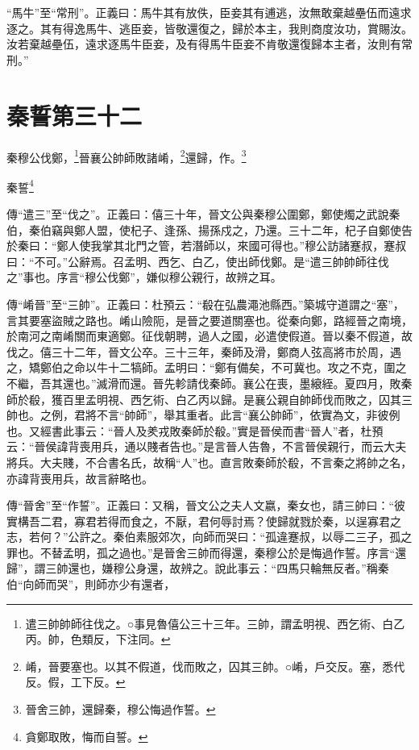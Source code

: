 {\noindent\shu{}\fzkt “馬牛”至“常刑”。正義曰：馬牛其有放佚，臣妾其有逋逃，汝無敢棄越壘伍而遠求逐之。其有得逸馬牛、逃臣妾，皆敬還復之，歸於本主，我則商度汝功，賞賜汝。汝若棄越壘伍，遠求逐馬牛臣妾，及有得馬牛臣妾不肯敬還復歸本主者，汝則有常刑。” \par}

\section{秦誓第三十二}


秦穆公伐鄭，\footnote{遣三帥帥師往伐之。○事見魯僖公三十三年。三帥，謂孟明視、西乞術、白乙丙。帥，色類反，下注同。}晉襄公帥師敗諸崤，\footnote{崤，晉要塞也。以其不假道，伐而敗之，囚其三帥。○崤，戶交反。塞，悉代反。假，工下反。}還歸，作。\footnote{晉舍三帥，還歸秦，穆公悔過作誓。}

秦誓\footnote{貪鄭取敗，悔而自誓。}


{\noindent\zhuan{}\fzbyks 傳“遣三”至“伐之”。正義曰：僖三十年，晉文公與秦穆公圍鄭，鄭使燭之武說秦伯，秦伯竊與鄭人盟，使杞子、逢孫、揚孫戍之，乃還。三十二年，杞子自鄭使告於秦曰：“鄭人使我掌其北門之管，若潛師以，來國可得也。”穆公訪諸蹇叔，蹇叔曰：“不可。”公辭焉。召孟明、西乞、白乙，使出師伐鄭。是“遣三帥帥師往伐之”事也。序言“穆公伐鄭”，嫌似穆公親行，故辨之耳。 \par}

{\noindent\zhuan{}\fzbyks 傳“崤晉”至“三帥”。正義曰：杜預云：“殽在弘農澠池縣西。”築城守道謂之“塞”，言其要塞盜賊之路也。崤山險阨，是晉之要道關塞也。從秦向鄭，路經晉之南境，於南河之南崤關而東適鄭。征伐朝聘，過人之國，必遣使假道。晉以秦不假道，故伐之。僖三十二年，晉文公卒。三十三年，秦師及滑，鄭商人弦高將市於周，遇之，矯鄭伯之命以牛十二犒師。孟明曰：“鄭有備矣，不可冀也。攻之不克，圍之不繼，吾其還也。”滅滑而還。晉先軫請伐秦師。襄公在喪，墨縗絰。夏四月，敗秦師於殽，獲百里孟明視、西乞術、白乙丙以歸。是襄公親自帥師伐而敗之，囚其三帥也。之例，君將不言“帥師”，舉其重者。此言“襄公帥師”，依實為文，非彼例也。又經書此事云：“晉人及羑戎敗秦師於殽。”實是晉侯而書“晉人”者，杜預云：“晉侯諱背喪用兵，通以賤者告也。”是言晉人告魯，不言晉侯親行，而云大夫將兵。大夫賤，不合書名氏，故稱“人”也。直言敗秦師於殽，不言秦之將帥之名，亦諱背喪用兵，故言辭略也。 \par}

{\noindent\zhuan{}\fzbyks 傳“晉舍”至“作誓”。正義曰：又稱，晉文公之夫人文嬴，秦女也，請三帥曰：“彼實構吾二君，寡君若得而食之，不厭，君何辱討焉？使歸就戮於秦，以逞寡君之志，若何？”公許之。秦伯素服郊次，向師而哭曰：“孤違蹇叔，以辱二三子，孤之罪也。不替孟明，孤之過也。”是晉舍三帥而得還，秦穆公於是悔過作誓。序言“還歸”，謂三帥還也，嫌穆公身還，故辨之。說此事云：“四馬只輪無反者。”稱秦伯“向師而哭”，則師亦少有還者， \par}

